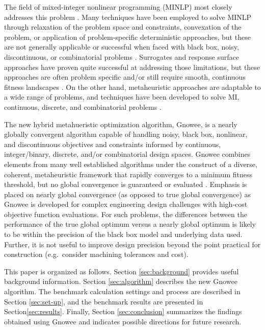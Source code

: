 \documentclass{article}                                                                           %
\begin{document}
The field of mixed-integer nonlinear programming (MINLP) most closely addresses this problem \cite{Burer2012, Floudas2009}.
Many techniques have been employed to solve MINLP through relaxation of the problem space and constraints, convexation of the problem, or application of problem-specific deterministic approaches, but these are not generally applicable or successful when faced with black box, noisy, discontinuous, or combinatorial problems \cite{Floudas2009, Bonami2012, Hemker2008}.
Surrogates and response surface approaches have proven quite successful at addressing those limitations, but these approaches are often problem specific and/or still require smooth, continuous fitness landscapes \cite{Hemker2008, Regis2005}.
On the other hand, metaheuristic approaches are adaptable to a wide range of problems, and techniques have been developed to solve MI, continuous, discrete, and combinatorial problems \cite{Yang2014, Egea2014, Yiqing2007, Tao1998}.

The new hybrid metahueristic optimization algorithm, Gnowee, is a nearly globally convergent algorithm capable of handling noisy, black box, nonlinear, and discontinuous objectives and constraints informed by continuous, integer/binary, discrete, and/or combinatorial design spaces.
Gnowee combines elements from many well established algorithms under the construct of a diverse, coherent, metaheuristic framework that rapidly converges to a minimum fitness threshold, but no global convergence is guaranteed or evaluated \cite{Yang2009, Lones2014, Sorensen2016}.
Emphasis is placed on nearly global convergence (as opposed to true global convergence) as Gnowee is developed for complex engineering design challenges with high-cost objective function evaluations. 
For such problems, the differences between the performance of the true global optimum versus a nearly global optimum is likely to be within the precision of the black box model and underlying data used. 
Further, it is not useful to improve design precision beyond the point practical for construction (e.g.\ consider machining tolerances and cost).     

This  paper  is  organized  as  follows.  
Section \ref{sec:background} provides useful background information.  
Section \ref{sec:algorithm} describes the new Gnowee algorithm.   
The benchmark calculation settings and process are described in Section \ref{sec:set-up}, and the benchmark results are presented in Section\ref{sec:results}. 
Finally, Section \ref{sec:conclusion} summarizes the findings obtained using Gnowee and indicates possible directions for future research.
\end{document}

